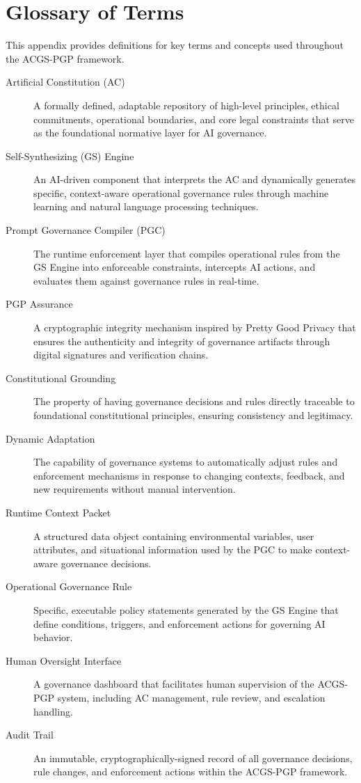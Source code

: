 \documentclass[sigconf,review,anonymous=false]{acmart} %
\begin{document}
\section{Glossary of Terms}
\label{app:glossary}
This appendix provides definitions for key terms and concepts used throughout the ACGS-PGP framework.

\begin{description}
    \item[Artificial Constitution (AC)] A formally defined, adaptable repository of high-level principles, ethical commitments, operational boundaries, and core legal constraints that serve as the foundational normative layer for AI governance.

    \item[Self-Synthesizing (GS) Engine] An AI-driven component that interprets the AC and dynamically generates specific, context-aware operational governance rules through machine learning and natural language processing techniques.

    \item[Prompt Governance Compiler (PGC)] The runtime enforcement layer that compiles operational rules from the GS Engine into enforceable constraints, intercepts AI actions, and evaluates them against governance rules in real-time.

    \item[PGP Assurance] A cryptographic integrity mechanism inspired by Pretty Good Privacy that ensures the authenticity and integrity of governance artifacts through digital signatures and verification chains.

    \item[Constitutional Grounding] The property of having governance decisions and rules directly traceable to foundational constitutional principles, ensuring consistency and legitimacy.

    \item[Dynamic Adaptation] The capability of governance systems to automatically adjust rules and enforcement mechanisms in response to changing contexts, feedback, and new requirements without manual intervention.

    \item[Runtime Context Packet] A structured data object containing environmental variables, user attributes, and situational information used by the PGC to make context-aware governance decisions.

    \item[Operational Governance Rule] Specific, executable policy statements generated by the GS Engine that define conditions, triggers, and enforcement actions for governing AI behavior.

    \item[Human Oversight Interface] A governance dashboard that facilitates human supervision of the ACGS-PGP system, including AC management, rule review, and escalation handling.

    \item[Audit Trail] An immutable, cryptographically-signed record of all governance decisions, rule changes, and enforcement actions within the ACGS-PGP framework.
\end{description}

\balance %
\end{document}
